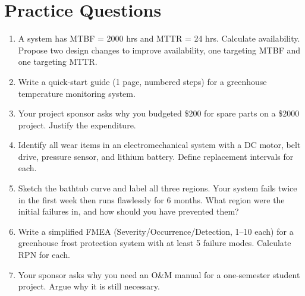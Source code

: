 \documentclass[11pt,letterpaper,twoside,openany]{book}
\begin{document}
\section{Practice Questions}
\begin{enumerate}[leftmargin=1.5em]
\item A system has MTBF = 2000 hrs and MTTR = 24 hrs. Calculate availability. Propose two design changes to improve availability, one targeting MTBF and one targeting MTTR.
\item Write a quick-start guide (1 page, numbered steps) for a greenhouse temperature monitoring system.
\item Your project sponsor asks why you budgeted \$200 for spare parts on a \$2000 project. Justify the expenditure.
\item Identify all wear items in an electromechanical system with a DC motor, belt drive, pressure sensor, and lithium battery. Define replacement intervals for each.
\item Sketch the bathtub curve and label all three regions. Your system fails twice in the first week then runs flawlessly for 6 months. What region were the initial failures in, and how should you have prevented them?
\item Write a simplified FMEA (Severity/Occurrence/Detection, 1--10 each) for a greenhouse frost protection system with at least 5 failure modes. Calculate RPN for each.
\item Your sponsor asks why you need an O\&M manual for a one-semester student project. Argue why it is still necessary.
\end{enumerate}
\end{document}
